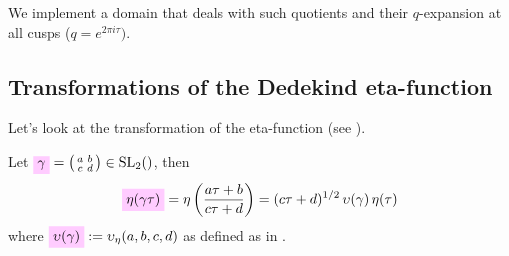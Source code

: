 \documentclass{article}
\begin{document}
We implement a domain that deals with such quotients and their
$q$-expansion at all cusps ($q=e^{2\pi i \tau})$.

\subsection{Transformations of the Dedekind eta-function}


Let's look at the transformation of the eta-function (see
\cite[Lemma~2.27]{Radu:PhD:2010}).

Let
$\defineNotation[gamma]{\gamma} =
\left(\begin{smallmatrix}a&b\\c&d\end{smallmatrix}\right) \in
\SL2Z$, then
\begin{gather}
\defineNotation[eta]{\eta(\gamma\tau)} =
\eta\left(\frac{a\tau+b}{c\tau+d}\right) =
(c\tau+d)^{1/2}\,\upsilon(\gamma)\,\eta(\tau)
\label{eq:eta-transformation}
\end{gather}
where
$\defineNotation[upsilon-gamma]{\upsilon(\gamma)} :=
\upsilon_\eta(a,b,c,d)$ as defined as in
\cite[Lemma~2.27]{Radu:PhD:2010}.
\end{document}
